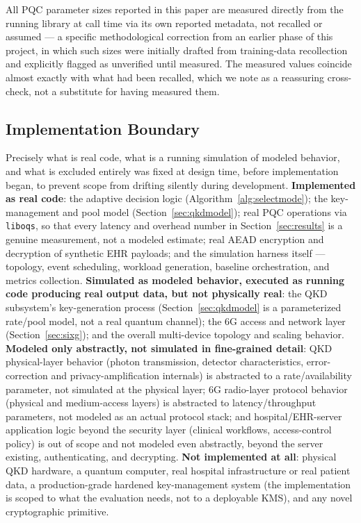 \documentclass[journal]{IEEEtran}
\begin{document}
All PQC parameter sizes reported in this paper are measured directly from the running library at call time via its own reported metadata, not recalled or assumed --- a specific methodological correction from an earlier phase of this project, in which such sizes were initially drafted from training-data recollection and explicitly flagged as unverified until measured. The measured values coincide almost exactly with what had been recalled, which we note as a reassuring cross-check, not a substitute for having measured them.

\subsection{Implementation Boundary}
\label{sec:implboundary}

Precisely what is real code, what is a running simulation of modeled behavior, and what is excluded entirely was fixed at design time, before implementation began, to prevent scope from drifting silently during development. \textbf{Implemented as real code}: the adaptive decision logic (Algorithm~\ref{alg:selectmode}); the key-management and pool model (Section~\ref{sec:qkdmodel}); real PQC operations via \texttt{liboqs}, so that every latency and overhead number in Section~\ref{sec:results} is a genuine measurement, not a modeled estimate; real AEAD encryption and decryption of synthetic EHR payloads; and the simulation harness itself --- topology, event scheduling, workload generation, baseline orchestration, and metrics collection. \textbf{Simulated as modeled behavior, executed as running code producing real output data, but not physically real}: the QKD subsystem's key-generation process (Section~\ref{sec:qkdmodel} is a parameterized rate/pool model, not a real quantum channel); the 6G access and network layer (Section~\ref{sec:sixg}); and the overall multi-device topology and scaling behavior. \textbf{Modeled only abstractly, not simulated in fine-grained detail}: QKD physical-layer behavior (photon transmission, detector characteristics, error-correction and privacy-amplification internals) is abstracted to a rate/availability parameter, not simulated at the physical layer; 6G radio-layer protocol behavior (physical and medium-access layers) is abstracted to latency/throughput parameters, not modeled as an actual protocol stack; and hospital/EHR-server application logic beyond the security layer (clinical workflows, access-control policy) is out of scope and not modeled even abstractly, beyond the server existing, authenticating, and decrypting. \textbf{Not implemented at all}: physical QKD hardware, a quantum computer, real hospital infrastructure or real patient data, a production-grade hardened key-management system (the implementation is scoped to what the evaluation needs, not to a deployable KMS), and any novel cryptographic primitive.
\end{document}
